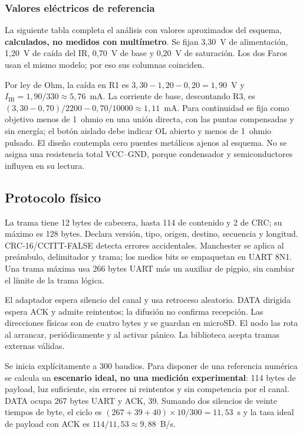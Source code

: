 \documentclass[11pt,letterpaper]{article}
\begin{document}
\subsubsection*{Valores eléctricos de referencia}

La siguiente tabla completa el análisis con valores aproximados del esquema,
\textbf{calculados, no medidos con multímetro}. Se fijan 3,30~V de alimentación,
1,20~V de caída del IR, 0,70~V de base y 0,20~V de saturación. Los dos Faros usan
el mismo modelo; por eso sus columnas coinciden.



Por ley de Ohm, la caída en R1 es \(3,30-1,20-0,20=1,90\)~V y
\(I_{\mathrm{IR}}=1,90/330\approx5,76\)~mA. La corriente de base, descontando
R3, es \((3,30-0,70)/2200-0,70/10000\approx1,11\)~mA.
Para continuidad se fija como objetivo menos de 1~ohmio en una unión directa,
con las puntas compensadas y sin energía; el botón aislado debe indicar
OL abierto y menos de 1~ohmio pulsado. El diseño contempla cero puentes
metálicos ajenos al esquema. No se asigna una resistencia total VCC--GND,
porque condensador y semiconductores influyen en su lectura.

\subsection{Protocolo físico}

La trama tiene 12 bytes de cabecera, hasta 114 de contenido y 2 de CRC; su máximo
es 128 bytes. Declara versión, tipo, origen, destino, secuencia y longitud.
CRC-16/CCITT-FALSE detecta errores accidentales. Manchester se aplica al
preámbulo, delimitador y trama; los medios bits se empaquetan en UART 8N1.
Una trama máxima usa 266 bytes UART más un auxiliar de pigpio, sin cambiar el
límite de la trama lógica.

El adaptador espera silencio del canal y usa retroceso aleatorio. DATA dirigida
espera ACK y admite reintentos; la difusión no confirma recepción. Las direcciones
físicas son de cuatro bytes y se guardan en microSD. El nodo las rota al arrancar,
periódicamente y al activar pánico. La biblioteca acepta tramas externas válidas.

Se inicia explícitamente a 300 baudios. Para disponer de una referencia numérica
se calcula un \textbf{escenario ideal, no una medición experimental}: 114 bytes
de payload, luz suficiente, sin errores ni reintentos y sin competencia por
el canal. DATA ocupa 267 bytes UART y ACK, 39. Sumando dos silencios de veinte
tiempos de byte, el ciclo es \((267+39+40)\times10/300=11,53\)~s y la tasa
ideal de payload con ACK es \(114/11,53\approx9,88\)~B/s.
\end{document}

